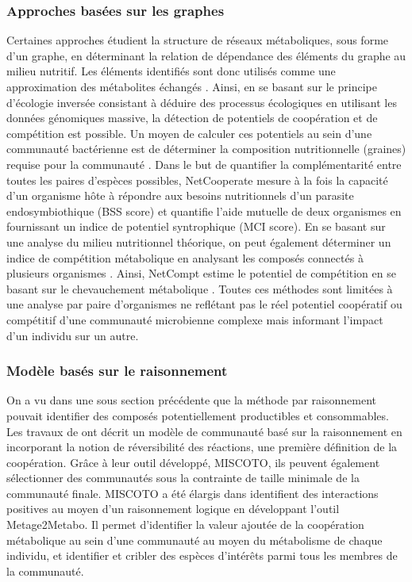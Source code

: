 \documentclass[../main.tex]{subfiles}
\begin{document}
\subsubsection{Approches basées sur les graphes}
Certaines approches étudient la structure de réseaux métaboliques, sous forme d'un graphe, en déterminant la relation de dépendance des éléments du graphe au milieu nutritif. Les éléments identifiés sont donc utilisés comme une approximation des métabolites échangés \citep{Levy}. Ainsi, en se basant sur le principe d'écologie inversée consistant à déduire des processus écologiques en utilisant les données génomiques massive, la détection de potentiels de coopération et de compétition est possible. Un moyen de calculer ces potentiels  au sein d'une communauté bactérienne est de déterminer la composition nutritionnelle (graines) requise pour la communauté \citep{Carr2012}. Dans le but de quantifier la complémentarité entre toutes les paires d'espèces possibles, NetCooperate \citep{Levy2015} mesure à la fois la capacité d'un organisme hôte à répondre aux besoins nutritionnels d'un parasite endosymbiothique (BSS score) et quantifie l'aide mutuelle de deux organismes en fournissant un indice de potentiel syntrophique (MCI score). En se basant sur une analyse du milieu nutritionnel théorique, on peut également déterminer un indice de compétition métabolique en analysant les composés connectés à plusieurs organismes \citep{Levy2013}. Ainsi, NetCompt estime le potentiel de compétition en se basant sur le chevauchement métabolique \citep{Kreimer2012}. Toutes ces méthodes sont limitées à une analyse par paire d'organismes ne reflétant pas le réel potentiel coopératif ou compétitif d'une communauté microbienne complexe mais informant l'impact d'un individu sur un autre. 


\subsubsection{Modèle basés sur le raisonnement}
On a vu dans une sous section précédente que la méthode par raisonnement pouvait identifier des composés potentiellement productibles et consommables. Les travaux de \citep{Frioux2018} ont décrit un modèle de communauté basé sur la raisonnement en incorporant la notion de réversibilité des réactions, une première définition de la coopération. Grâce à leur outil développé, MISCOTO, ils peuvent également sélectionner des communautés sous la contrainte de taille minimale de la communauté finale. MISCOTO a été élargis dans \citep{Belcour.2020} identifient des interactions positives au moyen d'un raisonnement logique en développant l'outil Metage2Metabo. Il permet d'identifier la valeur ajoutée de la coopération métabolique au sein d'une communauté au moyen du métabolisme de chaque individu, et identifier et cribler des espèces d'intérêts parmi tous les membres de la communauté.
\end{document}
